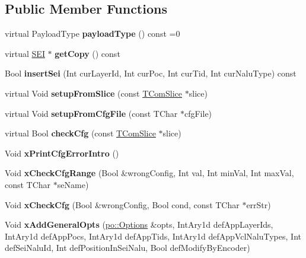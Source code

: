 \subsection*{Public Member Functions}
\begin{DoxyCompactItemize}
\item 
\mbox{\label{class_s_e_i_a9409e77d15b1567b90b1000e2449b6a2}} 
virtual Payload\+Type {\bfseries payload\+Type} () const =0
\item 
\mbox{\label{class_s_e_i_a3d771ca81e44ec59d2060645cf799a67}} 
virtual \hyperlink{class_s_e_i}{S\+EI} $\ast$ {\bfseries get\+Copy} () const
\item 
\mbox{\label{class_s_e_i_a37d03ec0ae4baf425c1568334d1b3944}} 
Bool {\bfseries insert\+Sei} (Int cur\+Layer\+Id, Int cur\+Poc, Int cur\+Tid, Int cur\+Nalu\+Type) const
\item 
\mbox{\label{class_s_e_i_ae9a76e9917edddf667a2caed26111c67}} 
virtual Void {\bfseries setup\+From\+Slice} (const \hyperlink{class_t_com_slice}{T\+Com\+Slice} $\ast$slice)
\item 
\mbox{\label{class_s_e_i_ac4c1601dae04466b3394d77e857d9ae0}} 
virtual Void {\bfseries setup\+From\+Cfg\+File} (const T\+Char $\ast$cfg\+File)
\item 
\mbox{\label{class_s_e_i_a0daba96a8529c80f8d9f6e7c9a2eaa87}} 
virtual Bool {\bfseries check\+Cfg} (const \hyperlink{class_t_com_slice}{T\+Com\+Slice} $\ast$slice)
\item 
\mbox{\label{class_s_e_i_a6d5c1fc62153e2f9bee8f367cbb9c2c3}} 
Void {\bfseries x\+Print\+Cfg\+Error\+Intro} ()
\item 
\mbox{\label{class_s_e_i_acda34f496ba1af85aa2f8ec620679607}} 
Void {\bfseries x\+Check\+Cfg\+Range} (Bool \&wrong\+Config, Int val, Int min\+Val, Int max\+Val, const T\+Char $\ast$se\+Name)
\item 
\mbox{\label{class_s_e_i_a8b472c7ab19d367b897475f05088246b}} 
Void {\bfseries x\+Check\+Cfg} (Bool \&wrong\+Config, Bool cond, const T\+Char $\ast$err\+Str)
\item 
\mbox{\label{class_s_e_i_a94f391f4d4cb8691777255bee620db23}} 
Void {\bfseries x\+Add\+General\+Opts} (\hyperlink{structdf_1_1program__options__lite_1_1_options}{po\+::\+Options} \&opts, Int\+Ary1d def\+App\+Layer\+Ids, Int\+Ary1d def\+App\+Pocs, Int\+Ary1d def\+App\+Tids, Int\+Ary1d def\+App\+Vcl\+Nalu\+Types, Int def\+Sei\+Nalu\+Id, Int def\+Position\+In\+Sei\+Nalu, Bool def\+Modify\+By\+Encoder)
\end{DoxyCompactItemize}
